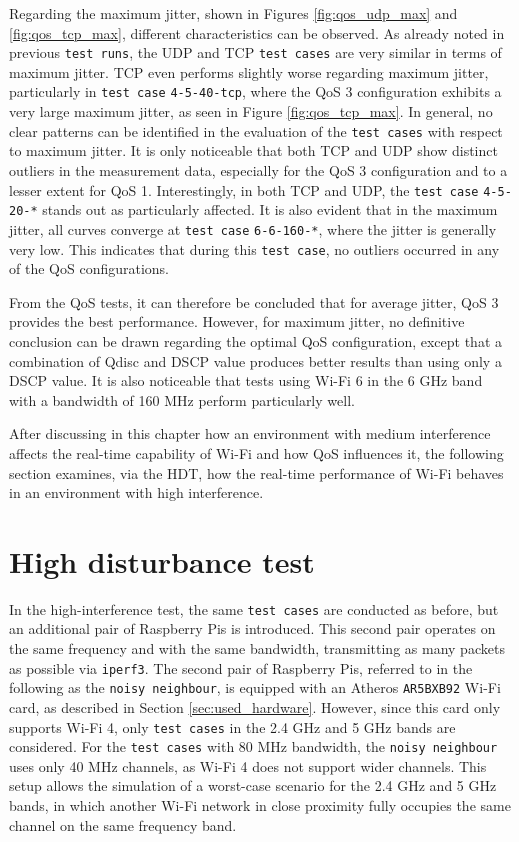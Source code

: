 Regarding the maximum jitter, shown in Figures \ref{fig:qos_udp_max} and \ref{fig:qos_tcp_max}, different characteristics can be observed.  
As already noted in previous \texttt{test runs}, the \ac{UDP} and \ac{TCP} \texttt{test cases} are very similar in terms of maximum jitter.  
\ac{TCP} even performs slightly worse regarding maximum jitter, particularly in \texttt{test case} \texttt{4-5-40-tcp}, where the \ac{QoS} 3 configuration exhibits a very large maximum jitter, as seen in Figure \ref{fig:qos_tcp_max}.  
In general, no clear patterns can be identified in the evaluation of the \texttt{test cases} with respect to maximum jitter.  
It is only noticeable that both \ac{TCP} and \ac{UDP} show distinct outliers in the measurement data, especially for the \ac{QoS} 3 configuration and to a lesser extent for \ac{QoS} 1.  
Interestingly, in both \ac{TCP} and \ac{UDP}, the \texttt{test case} \texttt{4-5-20-*} stands out as particularly affected.  
It is also evident that in the maximum jitter, all curves converge at \texttt{test case} \texttt{6-6-160-*}, where the jitter is generally very low.  
This indicates that during this \texttt{test case}, no outliers occurred in any of the \ac{QoS} configurations.  

From the \ac{QoS} tests, it can therefore be concluded that for average jitter, \ac{QoS} 3 provides the best performance.  
However, for maximum jitter, no definitive conclusion can be drawn regarding the optimal \ac{QoS} configuration, except that a combination of \ac{Qdisc} and \ac{DSCP} value produces better results than using only a \ac{DSCP} value.  
It is also noticeable that tests using Wi-Fi 6 in the 6 GHz band with a bandwidth of 160 MHz perform particularly well.  

After discussing in this chapter how an environment with medium interference affects the real-time capability of Wi-Fi and how \ac{QoS} influences it, the following section examines, via the \ac{HDT}, how the real-time performance of Wi-Fi behaves in an environment with high interference.  

\section{High disturbance test} \label{subsec:high}
In the high-interference test, the same \texttt{test cases} are conducted as before, but an additional pair of Raspberry Pis is introduced.  
This second pair operates on the same frequency and with the same bandwidth, transmitting as many packets as possible via \texttt{iperf3}.  
The second pair of Raspberry Pis, referred to in the following as the \texttt{noisy neighbour}, is equipped with an Atheros \texttt{AR5BXB92} Wi-Fi card, as described in Section \ref{sec:used_hardware}.  
However, since this card only supports Wi-Fi 4, only \texttt{test cases} in the 2.4 GHz and 5 GHz bands are considered.  
For the \texttt{test cases} with 80 MHz bandwidth, the \texttt{noisy neighbour} uses only 40 MHz channels, as Wi-Fi 4 does not support wider channels.  
This setup allows the simulation of a worst-case scenario for the 2.4 GHz and 5 GHz bands, in which another Wi-Fi network in close proximity fully occupies the same channel on the same frequency band.  

